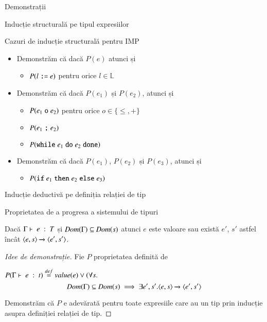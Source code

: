 \documentclass[xcolor=pdftex,romanian,colorlinks]{beamer}
\begin{document}
\begin{section}{Demonstrații}
\begin{subsection}{Inducție structurală pe tipul expresiilor}
\begin{frame}{Cazuri de inducție structurală pentru IMP}{}
\begin{itemize}
\item[]   
Demonstrăm că dacă $P(e)$ atunci și
\begin{itemize}
\item $P(l \mathrel{\text{\ttfamily :=}} e)$ pentru orice $l \in \mathbb{L}$
\end{itemize}
\item[] 
Demonstrăm că dacă $P(e_1)$ și $P(e_2)$, atunci și
\begin{itemize}
\item $P(e_1 \mathrel{\text{\ttfamily o}} e_2)$ pentru orice $o \in \{\leq, +\}$
\item $P(e_1 \mathrel{\text{\ttfamily ;}} e_2)$
\item $P(\mathrel{\text{\ttfamily while}} e_1 \mathrel{\text{\ttfamily do}} e_2 \mathrel{\text{\ttfamily done}})$ 
\end{itemize}
\item[]
Demonstrăm că dacă $P(e_1)$, $P(e_2)$ și $P(e_3)$, atunci și 
\begin{itemize}
\item $P(\mathrel{\text{\ttfamily if}} e_1 \mathrel{\text{\ttfamily then}} e_2 \mathrel{\text{\ttfamily else}} e_3)$ 
\end{itemize}
\end{itemize}
\end{frame}
\end{subsection}


\begin{subsection}{Inducție deductivă pe definiția relației de tip}

\begin{frame}{Proprietatea de a progresa a sistemului de tipuri}
\begin{theorem} Dacă ${\displaystyle \Gamma\vdash \; e \; : \; T}$ și $\mathop{\it Dom}(\Gamma) \subseteq \mathop{\it Dom}(s)$ atunci $e$ este valoare sau există $e'$, $s'$ astfel încât $\displaystyle{\ensuremath {{\langle{e,s}\rangle}} \xrightarrow{} {{\ensuremath \langle{e',s'}\rangle}}}$.
\end{theorem}
\begin{proof}[Idee de demonstrație]
 Fie $P$ proprietatea definită de 

\(P({\displaystyle \Gamma\vdash \; e \; : \; t}) \stackrel{def}{=} \mathop{value}(e) \vee (\forall s.\)
\[ \mathop{\it Dom}(\Gamma) \subseteq \mathop{\it Dom}(s) \implies \exists e',s'. \displaystyle{\ensuremath {{\langle{e,s}\rangle}} \xrightarrow{} {{\ensuremath \langle{e',s'}\rangle}}}\]

Demonstrăm că $P$ e adevărată pentru toate expresiile care au un tip prin inducție asupra definiției relației de tip.
\end{proof}
\end{frame}



\end{subsection}
\end{section}
\end{document}
